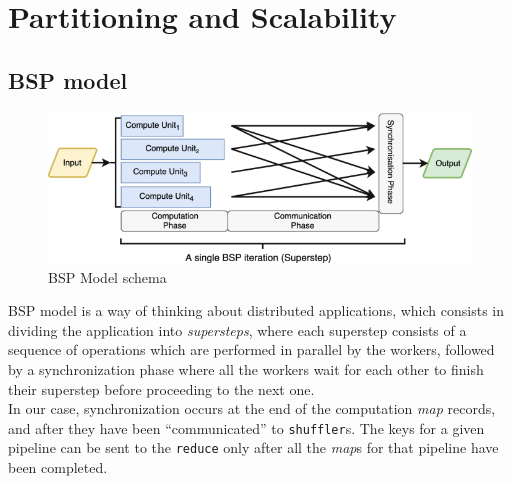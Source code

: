 \newpage
\section{Partitioning and Scalability}
\subsection{BSP model}
\begin{figure}[htbp]
   \centering
   \includegraphics{images/bspmodel.png}
   \caption{BSP Model schema}
   \label{fig:bspmodel}
\end{figure}
BSP model is a way of thinking about distributed applications, which consists in dividing the application into \textit{supersteps}, where each superstep consists of a sequence of operations which are performed in parallel by the workers, followed by a synchronization phase where all the workers wait for each other to finish their superstep before proceeding to the next one.\\
In our case, synchronization occurs at the end of the computation \textit{map} records, and after they have been ``communicated'' to \texttt{shuffler}s. The keys for a given pipeline can be sent to the \texttt{reduce} only after all the \textit{map}s for that pipeline have been completed.


